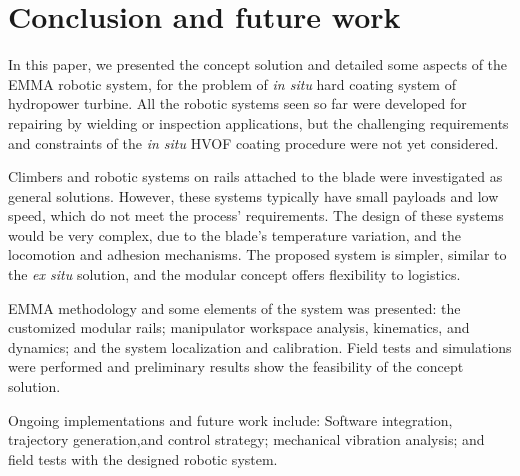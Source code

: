 \section{Conclusion and future work}

In this paper, we presented the concept solution and detailed some
aspects of the EMMA robotic system, for the problem of \textit{in situ} hard
coating system of hydropower turbine. All the robotic systems seen so far were
developed for repairing by wielding or inspection applications, but the
challenging requirements and constraints of the \textit{in situ} HVOF coating
procedure were not yet considered.

Climbers and robotic systems on rails attached to the blade were investigated as
general solutions. However, these systems typically have small payloads and
low speed, which do not meet the process' requirements. The design of these systems
would be very complex, due to the blade's temperature variation, and the
locomotion and adhesion mechanisms. The proposed system is simpler, similar to
the \textit{ex situ} solution, and the modular concept offers flexibility to
logistics.

EMMA methodology and some elements of the system was presented: the customized
modular rails; manipulator workspace analysis, kinematics, and dynamics; and
the system localization and calibration. Field tests and simulations were
performed and preliminary results show the feasibility of the concept solution.

Ongoing implementations and future work include: Software integration,
trajectory generation,and control strategy; mechanical
vibration analysis; and field tests with the designed robotic system.